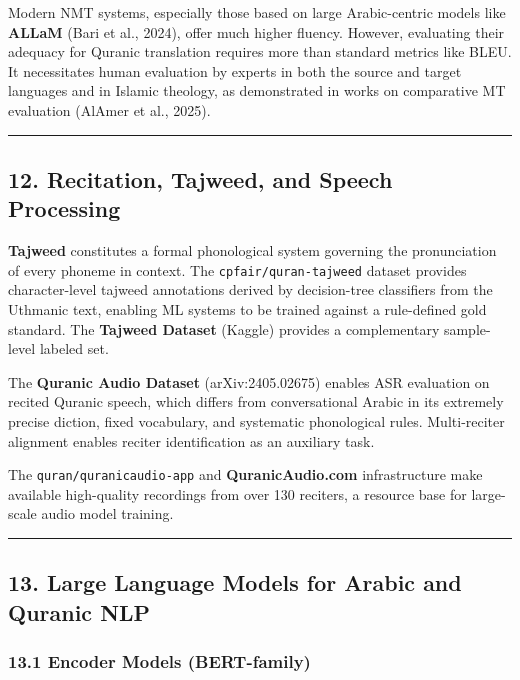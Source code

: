 \documentclass[12pt,a4paper]{article}
\begin{document}
Modern NMT systems, especially those based on large Arabic-centric
models like \textbf{ALLaM} (Bari et al., 2024), offer much higher
fluency. However, evaluating their adequacy for Quranic translation
requires more than standard metrics like BLEU. It necessitates human
evaluation by experts in both the source and target languages and in
Islamic theology, as demonstrated in works on comparative MT evaluation
(AlAmer et al., 2025).

\begin{center}\rule{0.5\linewidth}{0.5pt}\end{center}

\protect{}\label{s12}
\subsection{12. Recitation, Tajweed, and Speech
Processing}\label{recitation-tajweed-and-speech-processing}

\textbf{Tajweed} constitutes a formal phonological system governing the
pronunciation of every phoneme in context. The
\texttt{cpfair/quran-tajweed} dataset provides character-level tajweed
annotations derived by decision-tree classifiers from the Uthmanic text,
enabling ML systems to be trained against a rule-defined gold standard.
The \textbf{Tajweed Dataset} (Kaggle) provides a complementary
sample-level labeled set.

The \textbf{Quranic Audio Dataset} (arXiv:2405.02675) enables ASR
evaluation on recited Quranic speech, which differs from conversational
Arabic in its extremely precise diction, fixed vocabulary, and
systematic phonological rules. Multi-reciter alignment enables reciter
identification as an auxiliary task.

The \texttt{quran/quranicaudio-app} and \textbf{QuranicAudio.com}
infrastructure make available high-quality recordings from over 130
reciters, a resource base for large-scale audio model training.

\begin{center}\rule{0.5\linewidth}{0.5pt}\end{center}

\protect{}\label{s13}
\subsection{13. Large Language Models for Arabic and Quranic
NLP}\label{large-language-models-for-arabic-and-quranic-nlp}

\subsubsection{13.1 Encoder Models (BERT-family)}\label{s13-1}
\end{document}
